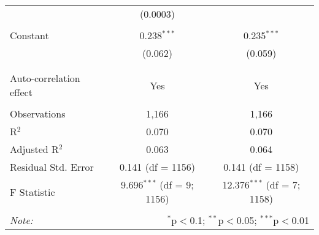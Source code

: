 \begin{table}[!htbp]
\begin{tabular}{@{\extracolsep{5pt}}lcc}
  & (0.0003) &  \\ 
  & & \\ 
 Constant & 0.238$^{***}$ & 0.235$^{***}$ \\ 
  & (0.062) & (0.059) \\ 
  & & \\ 
\hline \\[-1.8ex] 
Auto-correlation effect & Yes & Yes \\ 
\hline \\[-1.8ex] 
Observations & 1,166 & 1,166 \\ 
R$^{2}$ & 0.070 & 0.070 \\ 
Adjusted R$^{2}$ & 0.063 & 0.064 \\ 
Residual Std. Error & 0.141 (df = 1156) & 0.141 (df = 1158) \\ 
F Statistic & 9.696$^{***}$ (df = 9; 1156) & 12.376$^{***}$ (df = 7; 1158) \\ 
\hline 
\hline \\[-1.8ex] 
\textit{Note:}  & \multicolumn{2}{r}{$^{*}$p$<$0.1; $^{**}$p$<$0.05; $^{***}$p$<$0.01} \\ 
\end{tabular} 
\end{table} 
